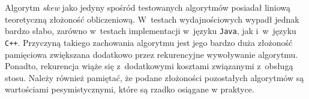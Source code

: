 Algorytm \emph{skew} jako jedyny spośród testowanych algorytmów posiadał liniową teoretyczną złożoność
obliczeniową. W~testach wydajnościowych wypadł jednak bardzo słabo, zarówno w~testach implementacji
w~języku \texttt{Java}, jak i~w~języku \texttt{C++}. Przyczyną takiego zachowania algorytmu jest
jego bardzo duża złożoność pamięciowa zwiększana dodatkowo przez rekurencyjne wywoływanie algorytmu.
Ponadto, rekurencja wiąże się z~dodatkowymi kosztami związanymi z~obsługą stosu. Należy również
pamiętać, że podane złożoności pozostałych algorytmów są wartościami pesymistycznymi, które są
rzadko osiągane w praktyce.


